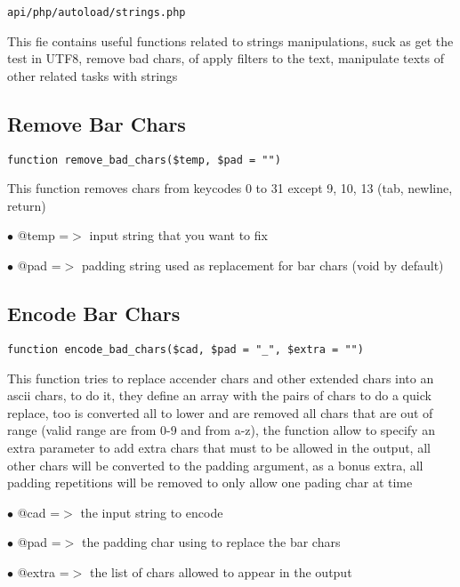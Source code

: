\documentclass[a4paper]{book}
\begin{document}
\begin{lstlisting}
api/php/autoload/strings.php
\end{lstlisting}

This fie contains useful functions related to strings manipulations, suck as get the test in
UTF8, remove bad chars, of apply filters to the text, manipulate texts of other related tasks
with strings

\hypertarget{toc270}{}
\subsection{Remove Bar Chars}

\begin{lstlisting}
function remove_bad_chars($temp, $pad = "")
\end{lstlisting}

This function removes chars from keycodes 0 to 31 except 9, 10, 13 (tab,
newline, return)

\begin{compactitem}
\item[\color{myblue}$\bullet$] @temp =$>$ input string that you want to fix
\item[\color{myblue}$\bullet$] @pad  =$>$ padding string used as replacement for bar chars (void by default)
\end{compactitem}

\hypertarget{toc271}{}
\subsection{Encode Bar Chars}

\begin{lstlisting}
function encode_bad_chars($cad, $pad = "_", $extra = "")
\end{lstlisting}

This function tries to replace accender chars and other extended chars into
an ascii chars, to do it, they define an array with the pairs of chars to
do a quick replace, too is converted all to lower and are removed all chars
that are out of range (valid range are from 0-9 and from a-z), the function
allow to specify an extra parameter to add extra chars that must to be
allowed in the output, all other chars will be converted to the padding
argument, as a bonus extra, all padding repetitions will be removed to
only allow one pading char at time

\begin{compactitem}
\item[\color{myblue}$\bullet$] @cad   =$>$ the input string to encode
\item[\color{myblue}$\bullet$] @pad   =$>$ the padding char using to replace the bar chars
\item[\color{myblue}$\bullet$] @extra =$>$ the list of chars allowed to appear in the output
\end{compactitem}
\end{document}
